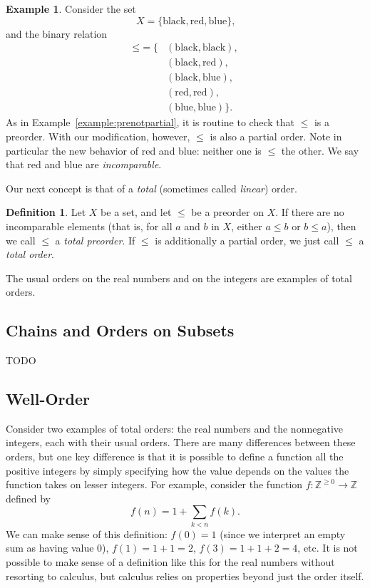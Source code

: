 \documentclass[letterpaper]{article}
\theoremstyle{definition}
\newtheorem{definition}[theorem]{Definition}
\newtheorem{example}[theorem]{Example}
\newcommand{\integers}{\mathbb{Z}}
\newcommand{\nnintegers}{{\integers^{\geq 0}}}
\begin{document}
\begin{example}
  \label{example:partialnotlinear}
  Consider the set
  \[X = \{\text{black}, \text{red}, \text{blue}\}\text{,}\]
  and the binary relation
  \begin{align*}
    \mathord{\leq} = \{
    &(\text{black}, \text{black}), \\
    &(\text{black}, \text{red}), \\
    &(\text{black}, \text{blue}), \\
    &(\text{red}, \text{red}), \\
    &(\text{blue}, \text{blue})
    \} \text{.}
  \end{align*}
  As in Example~\ref{example:prenotpartial}, it is routine to check
  that \(\leq\) is a preorder.  With our modification, however,
  \(\leq\) is also a partial order.  Note in particular the new
  behavior of red and blue: neither one is \(\leq\) the other.  We say
  that red and blue are \emph{incomparable}.
\end{example}

Our next concept is that of a \emph{total} (sometimes called
\emph{linear}) order.

\begin{definition}
  Let \(X\) be a set, and let \(\leq\) be a preorder on \(X\).  If
  there are no incomparable elements (that is, for all \(a\) and \(b\)
  in \(X\), either \(a \leq b\) or \(b \leq a\)), then we call
  \(\leq\) a \emph{total preorder}.  If \(\leq\) is additionally a
  partial order, we just call \(\leq\) a \emph{total order}.
\end{definition}

The usual orders on the real numbers and on the integers are examples
of total orders.

\subsection{Chains and Orders on Subsets}\label{section:chains}
TODO

\subsection{Well-Order}
Consider two examples of total orders: the real numbers and the
nonnegative integers, each with their usual orders.  There are many
differences between these orders, but one key difference is that it is
possible to define a function all the positive integers by simply
specifying how the value depends on the values the function takes on
lesser integers.  For example, consider the function \(f:\nnintegers
\to \integers\) defined by
\[ f(n) = 1+\sum_{k<n} f(k) \text{.} \]
We can make sense of this definition: \(f(0) = 1\) (since we interpret
an empty sum as having value 0), \(f(1) = 1+1 = 2\), \(f(3) = 1+1+2 =
4\), etc.  It is not possible to make sense of a definition like this
for the real numbers without resorting to calculus, but calculus
relies on properties beyond just the order itself.
\end{document}
